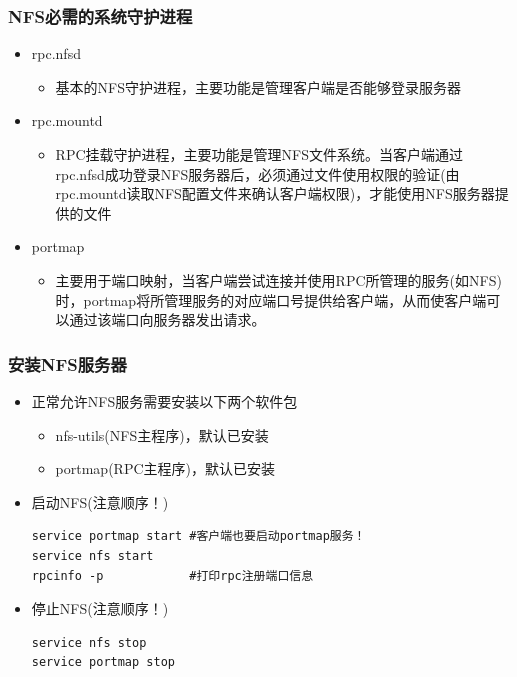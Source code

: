 \documentclass[xcolor=svgnames,presentation]{beamer}
\begin{document}
\begin{frame}
\frametitle{NFS必需的系统守护进程}
\label{sec-1-3}
\begin{itemize}

\item rpc.nfsd
\label{sec-1-3-1}%
\begin{itemize}

\item 基本的NFS守护进程，主要功能是管理客户端是否能够登录服务器
\label{sec-1-3-1-1}%
\end{itemize} %

\item rpc.mountd
\label{sec-1-3-2}%
\begin{itemize}

\item RPC挂载守护进程，主要功能是管理NFS文件系统。当客户端通过rpc.nfsd成功登录NFS服务器后，必须通过文件使用权限的验证(由rpc.mountd读取NFS配置文件来确认客户端权限)，才能使用NFS服务器提供的文件
\label{sec-1-3-2-1}%
\end{itemize} %

\item portmap
\label{sec-1-3-3}%
\begin{itemize}

\item 主要用于端口映射，当客户端尝试连接并使用RPC所管理的服务(如NFS)时，portmap将所管理服务的对应端口号提供给客户端，从而使客户端可以通过该端口向服务器发出请求。
\label{sec-1-3-3-1}%
\end{itemize} %
\end{itemize} %
\end{frame}
\begin{frame}[fragile]
\frametitle{安装NFS服务器}
\label{sec-1-4}
\begin{itemize}

\item 正常允许NFS服务需要安装以下两个软件包
\label{sec-1-4-1}%
\begin{itemize}

\item nfs-utils(NFS主程序)，默认已安装
\label{sec-1-4-1-1}%

\item portmap(RPC主程序)，默认已安装
\label{sec-1-4-1-2}%
\end{itemize} %

\item 启动NFS(注意顺序！)\\
\label{sec-1-4-2}%
\begin{verbatim}
service portmap start #客户端也要启动portmap服务！
service nfs start
rpcinfo -p            #打印rpc注册端口信息
\end{verbatim}

\item 停止NFS(注意顺序！)\\
\label{sec-1-4-3}%
\begin{verbatim}
service nfs stop
service portmap stop
\end{verbatim}
\end{itemize} %
\end{frame}
\end{document}
